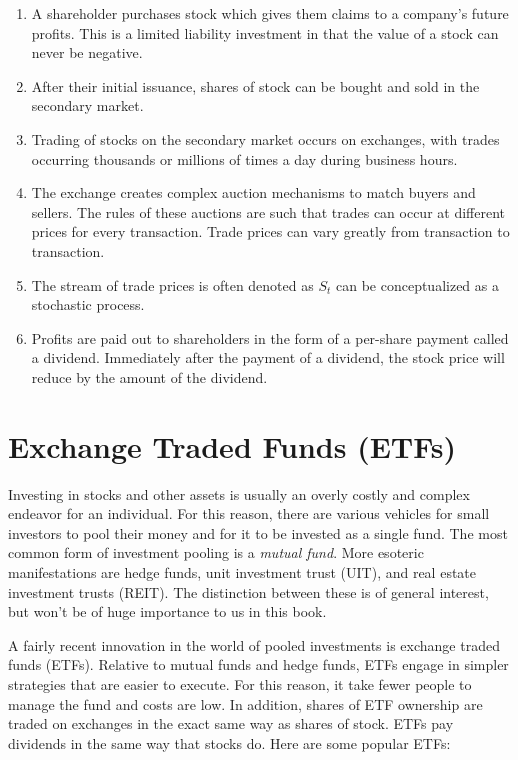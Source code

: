 \documentclass[11pt,]{krantz}
\begin{document}
\begin{enumerate}
\def\labelenumi{\arabic{enumi}.}
\item
  A shareholder purchases stock which gives them claims to a company's future profits. This is a limited liability investment in that the value of a stock can never be negative.
\item
  After their initial issuance, shares of stock can be bought and sold in the secondary market.
\item
  Trading of stocks on the secondary market occurs on exchanges, with trades occurring thousands or millions of times a day during business hours.
\item
  The exchange creates complex auction mechanisms to match buyers and sellers. The rules of these auctions are such that trades can occur at different prices for every transaction. Trade prices can vary greatly from transaction to transaction.
\item
  The stream of trade prices is often denoted as \(S_{t}\) can be conceptualized as a stochastic process.
\item
  Profits are paid out to shareholders in the form of a per-share payment called a dividend. Immediately after the payment of a dividend, the stock price will reduce by the amount of the dividend.
\end{enumerate}

\section{Exchange Traded Funds (ETFs)}\label{exchange-traded-funds-etfs}

Investing in stocks and other assets is usually an overly costly and complex endeavor for an individual. For this reason, there are various vehicles for small investors to pool their money and for it to be invested as a single fund. The most common form of investment pooling is a \emph{mutual fund}. More esoteric manifestations are hedge funds, unit investment trust (UIT), and real estate investment trusts (REIT). The distinction between these is of general interest, but won't be of huge importance to us in this book.

A fairly recent innovation in the world of pooled investments is exchange traded funds (ETFs). Relative to mutual funds and hedge funds, ETFs engage in simpler strategies that are easier to execute. For this reason, it take fewer people to manage the fund and costs are low. In addition, shares of ETF ownership are traded on exchanges in the exact same way as shares of stock. ETFs pay dividends in the same way that stocks do. Here are some popular ETFs:
\end{document}
